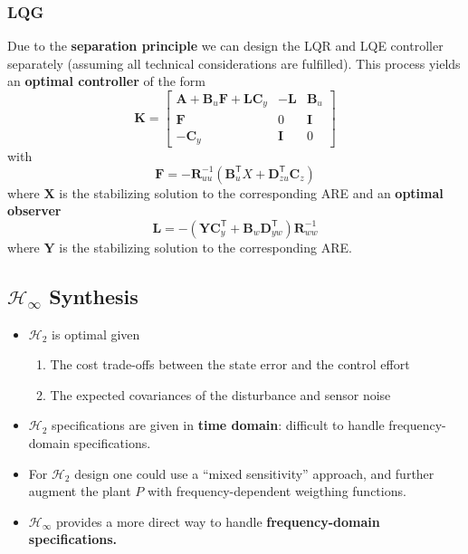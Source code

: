 \subsubsection{LQG}
Due to the \textbf{separation principle} we can design the LQR and LQE controller separately (assuming all technical considerations are fulfilled). This process yields an \textbf{optimal controller} of the form
\begin{equation*}
    \mathbf{K}=\left[\begin{array}{c|cc}%
            \mathbf{A}+\mathbf{B}_u \mathbf{F}+\mathbf{L}\mathbf{C}_y & -\mathbf{L} & \mathbf{B}_u \\
            \hline  %
            \mathbf{F}                                                & 0           & \mathbf{I}   \\
            -\mathbf{C}_y                                             & \mathbf{I}  & 0
        \end{array}\right]
\end{equation*}
with
\begin{equation*}
    \mathbf{F}=-\mathbf{R}_{uu}^{-1}(\mathbf{B}_{u}^{\mathsf{T}}X+\mathbf{D}_{zu}^{\mathsf{T}}\mathbf{C}_{z})
\end{equation*}
where $\mathbf{X}$ is the stabilizing solution to the corresponding ARE and an \textbf{optimal observer}
\begin{equation*}
    \mathbf{L}=-(\mathbf{Y}\mathbf{C}_y^{\mathsf{T}}+\mathbf{B}_w \mathbf{D}_{yw}^{\mathsf{T}})\mathbf{R}_{ww}^{-1}
\end{equation*}
where $\mathbf{Y}$ is the stabilizing solution to the corresponding ARE.

\subsection{\texorpdfstring{$\mathcal{H}_\infty$}{H-infinity} Synthesis}
\begin{itemize}
    \item $\mathcal{H}_2$ is optimal given
          \begin{enumerate}
              \item The cost trade-offs between the state error and the control effort
              \item The expected covariances of the disturbance and sensor noise
          \end{enumerate}
    \item $\mathcal{H}_2$ specifications are given in \textbf{time domain}: difficult to handle frequency-domain specifications.
    \item For $\mathcal{H}_2$ design one could use a ``mixed sensitivity'' approach, and further augment the plant $P$ with frequency-dependent weigthing functions.
    \item $\mathcal{H}_\infty$ provides a more direct way to handle \textbf{frequency-domain specifications.}
\end{itemize}

